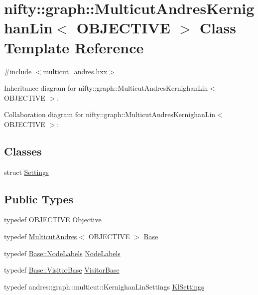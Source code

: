 \hypertarget{classnifty_1_1graph_1_1MulticutAndresKernighanLin}{}\section{nifty\+:\+:graph\+:\+:Multicut\+Andres\+Kernighan\+Lin$<$ O\+B\+J\+E\+C\+T\+I\+V\+E $>$ Class Template Reference}
\label{classnifty_1_1graph_1_1MulticutAndresKernighanLin}


{\ttfamily \#include $<$multicut\+\_\+andres.\+hxx$>$}



Inheritance diagram for nifty\+:\+:graph\+:\+:Multicut\+Andres\+Kernighan\+Lin$<$ O\+B\+J\+E\+C\+T\+I\+V\+E $>$\+:


Collaboration diagram for nifty\+:\+:graph\+:\+:Multicut\+Andres\+Kernighan\+Lin$<$ O\+B\+J\+E\+C\+T\+I\+V\+E $>$\+:
\subsection*{Classes}
\begin{DoxyCompactItemize}
\item 
struct \hyperlink{structnifty_1_1graph_1_1MulticutAndresKernighanLin_1_1Settings}{Settings}
\end{DoxyCompactItemize}
\subsection*{Public Types}
\begin{DoxyCompactItemize}
\item 
typedef O\+B\+J\+E\+C\+T\+I\+V\+E \hyperlink{classnifty_1_1graph_1_1MulticutAndresKernighanLin_a3c8e32ae3cc9b303101a00b46538c63c}{Objective}
\item 
typedef \hyperlink{classnifty_1_1graph_1_1MulticutAndres}{Multicut\+Andres}$<$ O\+B\+J\+E\+C\+T\+I\+V\+E $>$ \hyperlink{classnifty_1_1graph_1_1MulticutAndresKernighanLin_afd96990e2ad7afe119cd7a5bc633c0ba}{Base}
\item 
typedef \hyperlink{classnifty_1_1graph_1_1MulticutBase_afba61ad2919d0fad20b3745af19309da}{Base\+::\+Node\+Labels} \hyperlink{classnifty_1_1graph_1_1MulticutAndresKernighanLin_a7f60a40875a941835d767b510e0b513e}{Node\+Labels}
\item 
typedef \hyperlink{classnifty_1_1graph_1_1MulticutBase_a5882fb69df59d8113f6a81a0dac26eaa}{Base\+::\+Visitor\+Base} \hyperlink{classnifty_1_1graph_1_1MulticutAndresKernighanLin_a3f2ee1336d9b9d154d72ee2d16a2b71e}{Visitor\+Base}
\item 
typedef andres\+::graph\+::multicut\+::\+Kernighan\+Lin\+Settings \hyperlink{classnifty_1_1graph_1_1MulticutAndresKernighanLin_ad9c1a43deea51a0a54ade95d18397ff9}{Kl\+Settings}
\end{DoxyCompactItemize}
